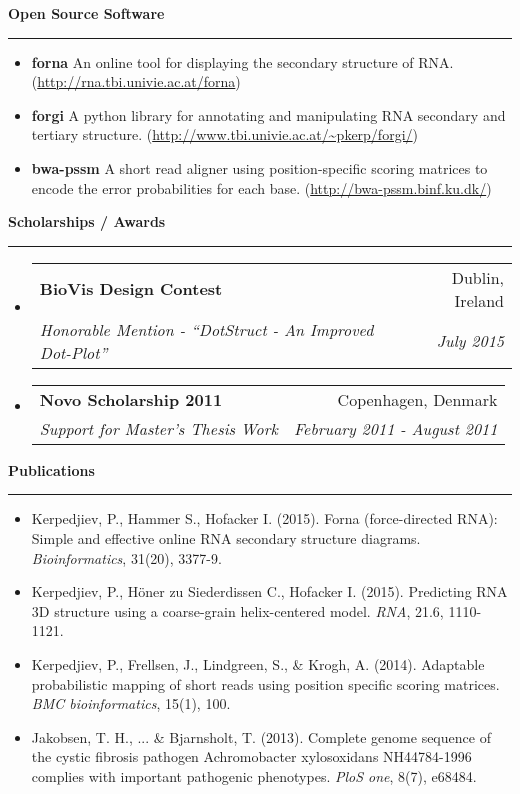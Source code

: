 \documentclass[letterpaper,11pt]{article}
\makeatletter
\newcommand{\resheading}[1]{{\normalsize {\textbf{#1 \vphantom{p\^{E}}}}}}
\newcommand{\ressubheading}[4]{
\begin{tabular*}{6.5in}{l@{\extracolsep{\fill}}r}
		\textbf{#1} & #2 \\
		\textit{#3} & \textit{#4} \\
\end{tabular*}\vspace{-6pt}}
\makeatother
\begin{document}
\resheading{Open Source Software}
\hrule
\begin{itemize}
  \item \textbf{forna} {An online tool for displaying the secondary structure of RNA. (\url{http://rna.tbi.univie.ac.at/forna})} 
   \item \textbf{forgi} {A python library for annotating and manipulating RNA secondary and tertiary structure. (\url{http://www.tbi.univie.ac.at/~pkerp/forgi/})} 
  \item \textbf{bwa-pssm} {A short read aligner using position-specific scoring matrices to encode the error probabilities for each base. (\url{http://bwa-pssm.binf.ku.dk/})}
\end{itemize}
\resheading{Scholarships / Awards}
\hrule
\begin{itemize}
  \item
  \ressubheading{BioVis Design Contest}{Dublin, Ireland}{Honorable Mention - ``DotStruct - An Improved Dot-Plot''}{July 2015}
  
\item
  \ressubheading{Novo Scholarship 2011}{Copenhagen, Denmark}{Support for Master's Thesis Work}{February 2011 - August 2011}

 \end{itemize}
\resheading{Publications}
\hrule
\begin{itemize}
   \item
	Kerpedjiev, P., Hammer S., Hofacker I. (2015). Forna (force-directed RNA): Simple and effective online RNA secondary structure diagrams. \textit{Bioinformatics}, 31(20), 3377-9.
	
  \item
	Kerpedjiev, P., H{\"o}ner zu Siederdissen C., Hofacker I. (2015). Predicting RNA 3D structure using a coarse-grain helix-centered model. \textit{RNA}, 21.6, 1110-1121.

\item
	Kerpedjiev, P., Frellsen, J., Lindgreen, S., \& Krogh, A. (2014). Adaptable probabilistic mapping of short reads using position specific scoring matrices. \textit{BMC bioinformatics}, 15(1), 100.

\item
	Jakobsen, T. H., ... \& Bjarnsholt, T. (2013). Complete genome sequence of the cystic fibrosis pathogen Achromobacter xylosoxidans NH44784-1996 complies with important pathogenic phenotypes. \textit{PloS one}, 8(7), e68484.
  
\end{itemize}
\end{document}
